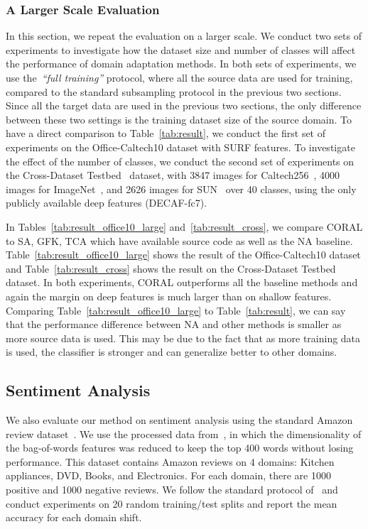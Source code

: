 \documentclass[letterpaper]{article}
\begin{document}
\subsubsection{A Larger Scale Evaluation}
\label{subsubsec:larger}
In this section, we repeat the evaluation on a larger scale. We conduct two sets of experiments to investigate how the dataset size and number of classes will affect the performance of domain adaptation methods. In both sets of experiments, we use the~\emph{``full training''} protocol, where all the source data are used for training, compared to the standard subsampling protocol in the previous two sections. Since all the target data are used in the previous two sections, the only difference between these two settings is the training dataset size of the source domain. To have a direct comparison to Table~\ref{tab:result}, we conduct the first set of experiments on the Office-Caltech10 dataset with SURF features. To investigate the effect of the number of classes, we conduct the second set of experiments on the Cross-Dataset Testbed~\cite{cross_dataset} dataset, with 3847 images for Caltech256~\cite{caltech256}, 4000 images for ImageNet~\cite{imagenet}, and 2626 images for SUN~\cite{sun_data} over 40 classes, using the only publicly available deep features (DECAF-fc7). 

In Tables~\ref{tab:result_office10_large} and~\ref{tab:result_cross}, we compare CORAL to SA, GFK, TCA which have available source code as well as the NA baseline. Table~\ref{tab:result_office10_large} shows the result of the Office-Caltech10 dataset and Table~\ref{tab:result_cross} shows the result on the Cross-Dataset Testbed dataset. In both experiments, CORAL outperforms all the baseline methods and again the margin on deep features is much larger than on shallow features. Comparing Table~\ref{tab:result_office10_large} to Table~\ref{tab:result}, we can say that the performance difference between NA and other methods is smaller as more source data is used. This may be due to the fact that as more training data is used, the classifier is stronger and can generalize better to other domains.

\subsection{Sentiment Analysis}
We also evaluate our method on sentiment analysis using the standard Amazon review dataset~\cite{Blitzer07Biographies,gong-icml13}. We use the processed data from~\cite{gong-icml13}, in which the dimensionality of the bag-of-words features was reduced to keep the top 400 words without losing performance. This dataset contains Amazon reviews on 4 domains: Kitchen appliances, DVD, Books, and Electronics. For each domain, there are 1000 positive and 1000 negative reviews. We follow the standard protocol of~\cite{gong-icml13} and conduct experiments on 20 random training/test splits and report the mean accuracy for each domain shift. 
\end{document}
